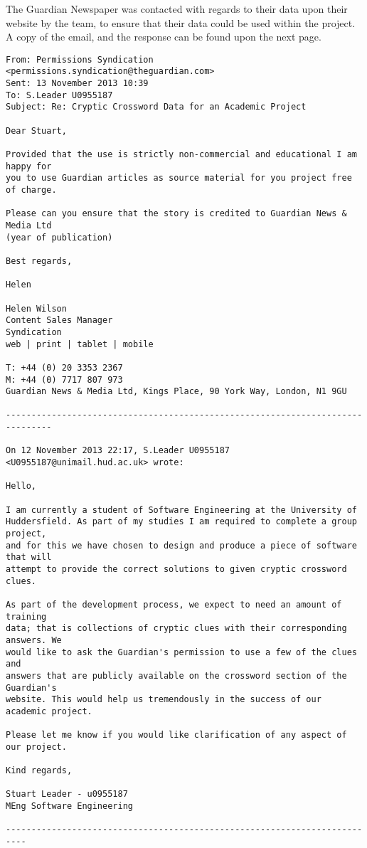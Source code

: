The Guardian Newspaper was contacted with regards to their data upon their 
website by the team, to ensure that their data could be used within the project.
A copy of the email, and the response can be found upon the next page.

\newpage
{
\footnotesize
\begin{verbatim}
From: Permissions Syndication <permissions.syndication@theguardian.com>
Sent: 13 November 2013 10:39
To: S.Leader U0955187
Subject: Re: Cryptic Crossword Data for an Academic Project
 
Dear Stuart,
 
Provided that the use is strictly non-commercial and educational I am happy for 
you to use Guardian articles as source material for you project free of charge. 
 
Please can you ensure that the story is credited to Guardian News & Media Ltd 
(year of publication) 

Best regards,

Helen
 
Helen Wilson
Content Sales Manager
Syndication
web | print | tablet | mobile
 
T: +44 (0) 20 3353 2367
M: +44 (0) 7717 807 973
Guardian News & Media Ltd, Kings Place, 90 York Way, London, N1 9GU

-------------------------------------------------------------------------------

On 12 November 2013 22:17, S.Leader U0955187 <U0955187@unimail.hud.ac.uk> wrote:

Hello,

I am currently a student of Software Engineering at the University of
Huddersfield. As part of my studies I am required to complete a group project,
and for this we have chosen to design and produce a piece of software that will
attempt to provide the correct solutions to given cryptic crossword clues.

As part of the development process, we expect to need an amount of training
data; that is collections of cryptic clues with their corresponding answers. We
would like to ask the Guardian's permission to use a few of the clues and
answers that are publicly available on the crossword section of the Guardian's
website. This would help us tremendously in the success of our academic project.

Please let me know if you would like clarification of any aspect of our project.

Kind regards,

Stuart Leader - u0955187
MEng Software Engineering

--------------------------------------------------------------------------
\end{verbatim}
}

